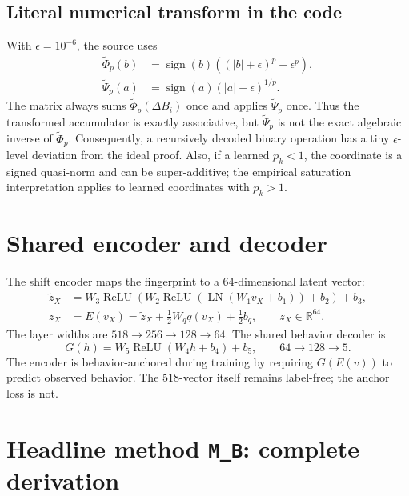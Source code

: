 \documentclass[11pt,a4paper]{article}
\newcommand{\R}{\mathbb{R}}
\newcommand{\dB}{\Delta B}
\newcommand{\MB}{\texttt{M\_B}}
\newcommand{\sign}{\operatorname{sign}}
\begin{document}
\subsection{Literal numerical transform in the code}

With $\epsilon=10^{-6}$, the source uses
\begin{align}
\widetilde\Phi_p(b)&=\sign(b)
\left((|b|+\epsilon)^p-\epsilon^p\right),\\
\widetilde\Psi_p(a)&=\sign(a)(|a|+\epsilon)^{1/p}.
\end{align}
The matrix always sums $\widetilde\Phi_p(\dB_i)$ once and applies
$\widetilde\Psi_p$ once.  Thus the transformed accumulator is exactly
associative, but $\widetilde\Psi_p$ is not the exact algebraic inverse of
$\widetilde\Phi_p$.  Consequently, a recursively decoded binary operation has
a tiny $\epsilon$-level deviation from the ideal proof.  Also, if a learned
$p_k<1$, the coordinate is a signed quasi-norm and can be super-additive; the
empirical saturation interpretation applies to learned coordinates with
$p_k>1$.

\section{Shared encoder and decoder}

The shift encoder maps the fingerprint to a 64-dimensional latent vector:
\begin{align}
\widetilde z_X&=W_3\operatorname{ReLU}\!\left(
W_2\operatorname{ReLU}\!\left(
\operatorname{LN}(W_1v_X+b_1)\right)+b_2\right)+b_3,\\
z_X&=E(v_X)=\widetilde z_X+\tfrac12 W_q q(v_X)+\tfrac12b_q,
\qquad z_X\in\R^{64}.
\end{align}
The layer widths are $518\to256\to128\to64$.  The shared behavior decoder is
\begin{equation}
G(h)=W_5\operatorname{ReLU}(W_4h+b_4)+b_5,
\qquad 64\to128\to5.
\end{equation}
The encoder is behavior-anchored during training by requiring $G(E(v))$ to
predict observed behavior.  The 518-vector itself remains label-free; the
anchor loss is not.

\section{Headline method \MB: complete derivation}
\end{document}
